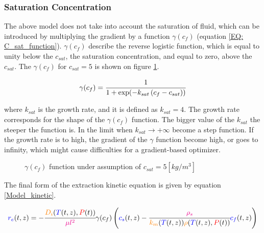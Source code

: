 \documentclass[../Article_Model_Parameters.tex]{subfiles}
\begin{document}
	
	\subsubsection{Saturation Concentration}
	
	The above model does not take into account the saturation of fluid, which can be introduced by multiplying the gradient by a function $\gamma(c_f)$ (equation \ref{EQ: C_sat_function}). $\gamma(c_f)$ describe the reverse logistic function, which is equal to unity below the $c_{sat}$, the saturation concentration, and equal to zero, above the $c_{sat}$. The $\gamma(c_f)$ for $c_{sat}=5$ is shown on figure \ref{fig: Gamma_function}.
			
	{\footnotesize
		\begin{equation}
			\gamma(c_f) = \cfrac{1}{1+\exp ( -k_{sat} \left( c_f - c_{sat} \right) ) }
			\label{EQ: C_sat_function}
			\end{equation}
	}
			
	where $k_{sat}$ is the growth rate, and it is defined as $k_{sat} = 4$. The growth rate corresponds for the shape of the $\gamma(c_f)$ function. The bigger value of the $k_{sat}$ the steeper the function is. In the limit when $ k_{sat}\rightarrow+\infty$ become a step function. If the growth rate is to high, the gradient of the $\gamma$ function become high, or goes to infinity, which might cause difficulties for a gradient-based optimizer.
			
	\begin{figure}[h!]
		\centering
			\caption{$\gamma(c_f)$ function under assumption of $c_{sat}=5 [kg/m^3]$}
			\label{fig: Gamma_function}
	\end{figure}
			
			
	The final form of the extraction kinetic equation is given by equation \ref{Model_kinetic}.
			
	{\footnotesize
		\begin{equation}
			\label{Model_kinetic}
				{\color{blue}r_e}(t,z) = -\cfrac{{\color{orange}D_i}({\color{blue}T}(t,z), {\color{red}P}(t))}{{\color{magenta} \mu l^2} } \gamma(c_f) \left({\color{blue}c_s}(t,z) - \cfrac{{\color{magenta}\rho_s}}{{\color{orange}k_m}({\color{blue}T}(t,z)){\color{orange}\rho}({\color{blue}T}(t,z),{\color{red}P}(t))}  {\color{blue}c_f}(t,z) \right)
		\end{equation} }
			
\end{document}
